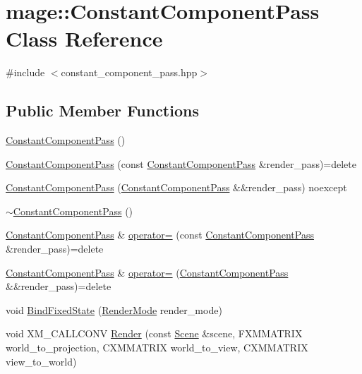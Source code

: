 \hypertarget{classmage_1_1_constant_component_pass}{}\section{mage\+:\+:Constant\+Component\+Pass Class Reference}
\label{classmage_1_1_constant_component_pass}


{\ttfamily \#include $<$constant\+\_\+component\+\_\+pass.\+hpp$>$}

\subsection*{Public Member Functions}
\begin{DoxyCompactItemize}
\item 
\hyperlink{classmage_1_1_constant_component_pass_acd197274863c82c9f1551c7e6171e4c9}{Constant\+Component\+Pass} ()
\item 
\hyperlink{classmage_1_1_constant_component_pass_ac3112acde3a0504febef699873efe1ff}{Constant\+Component\+Pass} (const \hyperlink{classmage_1_1_constant_component_pass}{Constant\+Component\+Pass} \&render\+\_\+pass)=delete
\item 
\hyperlink{classmage_1_1_constant_component_pass_a740def3e95651180a7f2392a922e0706}{Constant\+Component\+Pass} (\hyperlink{classmage_1_1_constant_component_pass}{Constant\+Component\+Pass} \&\&render\+\_\+pass) noexcept
\item 
\hyperlink{classmage_1_1_constant_component_pass_aaa94607b422672dab4cb77f129382d1b}{$\sim$\+Constant\+Component\+Pass} ()
\item 
\hyperlink{classmage_1_1_constant_component_pass}{Constant\+Component\+Pass} \& \hyperlink{classmage_1_1_constant_component_pass_a513b83527fdb17a760032b76f3c17012}{operator=} (const \hyperlink{classmage_1_1_constant_component_pass}{Constant\+Component\+Pass} \&render\+\_\+pass)=delete
\item 
\hyperlink{classmage_1_1_constant_component_pass}{Constant\+Component\+Pass} \& \hyperlink{classmage_1_1_constant_component_pass_ab1944cfe6c59d28d34fb6c6d05bd0b96}{operator=} (\hyperlink{classmage_1_1_constant_component_pass}{Constant\+Component\+Pass} \&\&render\+\_\+pass)=delete
\item 
void \hyperlink{classmage_1_1_constant_component_pass_a87e9d62d5d93b1a66388ab0ccd494e8b}{Bind\+Fixed\+State} (\hyperlink{namespacemage_a9d24b35ed0bdecf8535e2b91fe0eebba}{Render\+Mode} render\+\_\+mode)
\item 
void X\+M\+\_\+\+C\+A\+L\+L\+C\+O\+NV \hyperlink{classmage_1_1_constant_component_pass_a8650124f2a85ab18e56d2058305ad008}{Render} (const \hyperlink{classmage_1_1_scene}{Scene} \&scene, F\+X\+M\+M\+A\+T\+R\+IX world\+\_\+to\+\_\+projection, C\+X\+M\+M\+A\+T\+R\+IX world\+\_\+to\+\_\+view, C\+X\+M\+M\+A\+T\+R\+IX view\+\_\+to\+\_\+world)
\end{DoxyCompactItemize}
